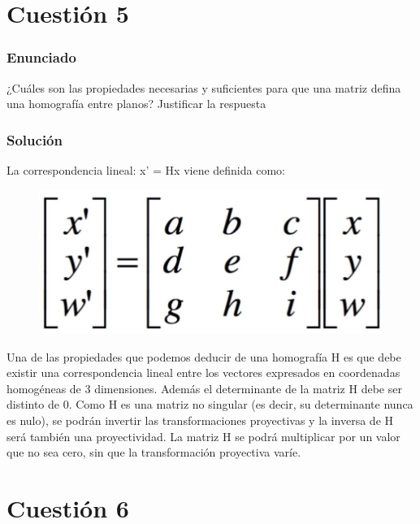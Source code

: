 \section{Cuestión 5}

\subsubsection{Enunciado}

¿Cuáles son las propiedades necesarias y suficientes para que una matriz defina una homografía entre planos? Justificar la respuesta

\subsubsection{Solución}

La correspondencia lineal: x' = Hx viene definida como:

\begin{figure}[H]
\centering
\includegraphics[width=0.7\linewidth]{ej5}
\caption{}
\label{fig:ej5}
\end{figure}

Una de las propiedades que podemos deducir de una homografía H es que debe existir una correspondencia lineal entre los vectores expresados en coordenadas homogéneas de 3 dimensiones. Además el determinante de la matriz H debe ser distinto de 0.
Como H es una matriz no singular (es decir, su determinante nunca es nulo), se podrán invertir las transformaciones proyectivas y la inversa de H será también una proyectividad.
La matriz H se podrá multiplicar por un valor que no sea cero, sin que la transformación proyectiva varíe.


\section{Cuestión 6}

